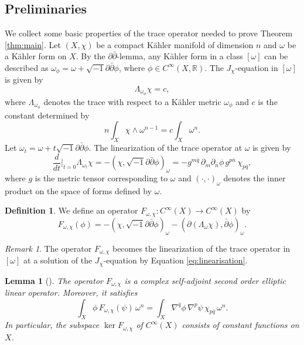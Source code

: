 \documentclass{amsart}
\numberwithin{equation}{section}
\theoremstyle{plain}
\newtheorem{lemma}[equation]{Lemma}
\theoremstyle{definition}
\newtheorem{definition}[equation]{Definition}
\theoremstyle{remark}
\newtheorem{remark}[equation]{Remark}
\begin{document}
\subsection{Preliminaries}\label{sec:pre}
We collect some basic properties of the trace operator needed to prove Theorem \ref{thm:main}. 
Let $(X, \chi)$ be a compact K{\"a}hler manifold of dimension $n$ and $\omega$ be a K{\"a}hler form on $X$. 
By the $\partial \bar{\partial}$-lemma, any K{\"a}hler form in a class $[\omega]$ can be described as $\omega_\phi = \omega + \sqrt{-1} \partial \bar{\partial} \phi$, where $\phi \in C^\infty(X, \mathbb{R})$.
The $J_\chi$-equation in $[\omega]$ is given by 
$$ \Lambda_{\omega_\phi} \chi = c,$$ 
where $\Lambda_{\omega_\phi}$ denotes the trace with respect to a K{\"a}hler metric $\omega_\phi$ and $c$ is the constant determined by 
$${n \int_X \chi \wedge \omega^{n-1}} = c\int_X \omega^n.$$
Let $\omega_t = \omega + t \sqrt{-1} \partial \bar{\partial} \phi $.
The linearization of the trace operator at $\omega$ is given by 
\begin{equation}\label{eq:linearisation}
\frac{d}{dt}\Big|_{t = 0} \Lambda_{\omega_t} \chi = 
{- ( \chi , \sqrt{-1} \partial \bar{\partial} \phi)_\omega } =
{- {g^{m \bar{q}}} \, {\partial_m \partial_{\bar{n}} \phi} \, {g^{p \bar{n}}} \, {\chi_{p \bar{q}}}},
\end{equation}
where $g$ is the metric tensor corresponding to $\omega$ and $(\cdot,\cdot)_\omega $ denotes the inner product on the space of forms defined by $\omega$.

\begin{definition}\label{def:F-op}
We define an operator $F_{\omega, \chi} : C^{\infty}(X) \rightarrow C^{\infty}(X) $ by 
$$F_{\omega, \chi} (\phi) = {-{ \left( \chi , {\sqrt{-1} \partial \bar{\partial} \phi} \right)_\omega} - \left( \partial \left( \Lambda_\omega \chi \right) , \bar{\partial} \phi \right)_\omega }. $$
\end{definition}

\begin{remark}
The operator $F_{\omega, \chi}$ becomes the linearization of the trace operator in $[\omega]$ at a solution of the $J_\chi$-equation by Equation \eqref{eq:linearisation}. 
\end{remark}

\begin{lemma}[{\cite[Lemma 2.2]{Hashimoto2018}}]\label{lem:properties}
The operator $F_ {\omega, \chi}$ is a complex self-adjoint second order elliptic linear operator. Moreover, it satisfies 
$$ \int_X {\phi \, F_{\omega, \chi} (\psi)} \, \omega^{n} 
= \int_X \nabla^{\bar{q}} \phi \, \nabla^{p} \psi \, {\chi_{p \bar{q}}} \, \omega^n.$$ 
In particular, the subspace $\mathop{\mathrm{ker}}F_{\omega, \chi}$ of $C^\infty(X)$ consists of constant functions on $X$.
\end{lemma}
\end{document}
